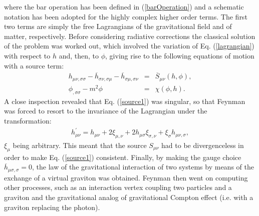\documentclass{ws-procs961x669}            %
\begin{document}
%
where the bar operation has been defined in (\ref{barOperation})
and a schematic notation has been adopted for the highly complex
higher order terms. The first two terms are simply the free
Lagrangians of the gravitational field and of matter,
respectively. Before considering radiative corrections the
classical solution of the problem was worked out, which involved
the variation of Eq. (\ref{lagrangian}) with respect to $h$ and,
then, to $\phi$, giving rise to the following equations of motion
with a source term:
%
\begin{eqnarray} \label{source1}
h_{\mu\nu,\sigma\sigma} - \overline{h}_{\sigma\nu,\sigma\mu} -
\overline{h}_{\sigma\mu,\sigma\nu} &=& \overline{S}_{\mu\nu}
\left(h, \phi \right),\\ \label{source2} \phi_{,\sigma\sigma} -
m^2 \phi &=& \chi \left(\phi, h \right).
\end{eqnarray}
%
A close inspection revealed that Eq. (\ref{source1}) was singular,
so that Feynman was forced to resort to the invariance of the
Lagrangian under the transformation:
%
\begin{eqnarray} \label{invariance}
h_{\mu\nu}^{'} = h_{\mu\nu} + 2 \xi_{\mu,\nu} + 2 h_{\mu\sigma}\xi_{\sigma,\nu} + \xi_{\sigma} h_{\mu\nu,\sigma},
\end{eqnarray}
%
$\xi_{\mu}$ being arbitrary. This meant that the source
$S_{\mu\nu}$ had to be divergenceless in order to make Eq.
(\ref{source1}) consistent. Finally, by making the gauge choice
$\overline{h}_{\mu\sigma,\sigma}=0$, the law of the gravitational
interaction of two systems by means of the exchange of a virtual
graviton was obtained. Feynman then went on computing other
processes, such as an interaction vertex coupling two particles
and a graviton and the gravitational analog of gravitational
Compton effect (i.e. with a graviton replacing the photon).
\end{document}

